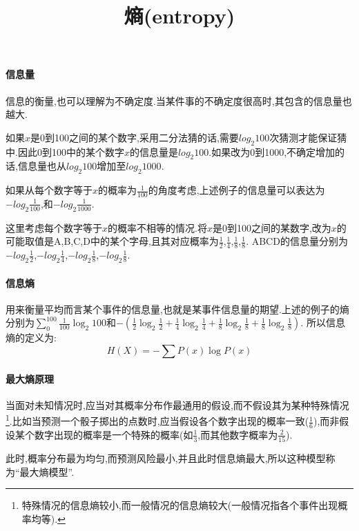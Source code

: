 \documentclass{ctexart}
\begin{document}
\title{熵(entropy)}
\maketitle

\paragraph{信息量}
信息的衡量,也可以理解为不确定度.当某件事的不确定度很高时,其包含的信息量也越大.

如果$x$是0到100之间的某个数字,采用二分法猜的话,需要$log_2{100}$次猜测才能保证猜中.因此0到100中的某个数字$x$的信息量是$log_2{100}$.如果改为0到1000,不确定增加的话,信息量也从$log_2{100}$增加至$log_2{1000}$.

如果从每个数字等于$x$的概率为$\frac{1}{100}$的角度考虑,上述例子的信息量可以表达为$-log_2{\frac{1}{100}}$,和$-log_2{\frac{1}{1000}}$.

这里考虑每个数字等于$x$的概率不相等的情况.将$x$是0到100之间的某数字,改为$x$的可能取值是A,B,C,D中的某个字母,且其对应概率为$\frac{1}{2}$,$\frac{1}{4}$,$\frac{1}{8}$,$\frac{1}{8}$.
ABCD的信息量分别为$-log_2{\frac{1}{2}}$,$-log_2{\frac{1}{4}}$,$-log_2{\frac{1}{8}}$,$-log_2{\frac{1}{8}}$.

\paragraph{信息熵}用来衡量平均而言某个事件的信息量,也就是某事件信息量的期望.上述的例子的熵分别为$\sum_0^{100} \frac{1}{100}\log_2{100}$和$-(\frac{1}{2}\log_2{\frac{1}{2}}+\frac{1}{4}\log_2{\frac{1}{4}}+\frac{1}{8}\log_2{\frac{1}{8}}+\frac{1}{8}\log_2{\frac{1}{8}})$.
所以信息熵的定义为:$$H(X)=-\sum P(x)\log{P(x)}$$

\paragraph{最大熵原理} 当面对未知情况时,应当对其概率分布作最通用的假设,而不假设其为某种特殊情况\footnote{特殊情况的信息熵较小,而一般情况的信息熵较大(一般情况指各个事件出现概率均等).}.比如当预测一个骰子掷出的点数时,应当假设各个数字出现的概率一致($\frac{1}{6}$),而非假设某个数字出现的概率是一个特殊的概率(如$\frac{1}{3}$,而其他数字概率为$\frac{2}{15}$).

此时,概率分布最为均匀,而预测风险最小,并且此时信息熵最大,所以这种模型称为“最大熵模型”\cite{wujun-2008}.	









	
\end{document}
